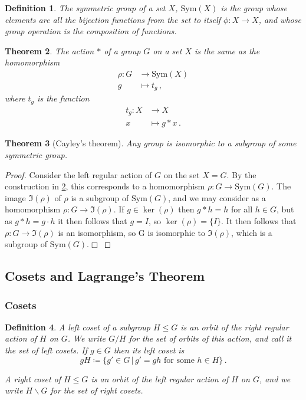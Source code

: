 \documentclass{article}
\theoremstyle{plain}\theoremheaderfont{\normalfont\itshape}\theorembodyfont{\rmfamily}\theoremseparator{.}\newtheorem*{rem}{Remark}\newtheorem*{ex}{Example}\newtheorem*{proof}{Proof}\newtheorem*{altp}{Alternative proof}
\theoremstyle{plain}\theoremheaderfont{\normalfont\bfseries}\theorembodyfont{\rmfamily}\theoremseparator{.}\newtheorem{thm}{Theorem}[section]\newtheorem{lem}[thm]{Lemma}\newtheorem{prop}[thm]{Proposition}\newtheorem*{cor}{Corollary}\newtheorem{defn}[thm]{Definition}\newtheorem{clm}[thm]{Claim}\newtheorem{clminproof}{Claim}
\theoremstyle{break}\theoremheaderfont{\normalfont\itshape}\theorembodyfont{\rmfamily}\theoremseparator{.\medskip}\newtheorem*{proofskip}{Proof}\newtheorem*{exs}{Examples}\newtheorem*{rems}{Remarks}
\theoremstyle{break}\theoremheaderfont{\normalfont\bfseries}\theorembodyfont{\rmfamily}\theoremseparator{.\medskip}\newtheorem{lemskip}[thm]{Lemma}\newtheorem{defnskip}[thm]{Definition}\newtheorem{propskip}[thm]{Proposition}\newtheorem{thmskip}[thm]{Theorem}
\numberwithin{equation}{section}
\newcommand{\qed}{\hfill\ensuremath{\Box}}
\begin{document}
	\begin{defn}
		The \textit{symmetric group} of a set \(X\), \(\mathrm{Sym}(X)\) is the group whose elements are all the bijection functions from the set to itself \(\phi: X\to X\), and whose group operation is the composition of functions.
	\end{defn}
	\begin{thm}\label{actionthm}
		The action \(*\) of a group \(G\) on a set \(X\) is the same as the homomorphism
		\begin{align*}
			\rho:G&\to\mathrm{Sym}(X)\\
			g&\mapsto t_g\,,
		\end{align*}
		where \(t_g\) is the function
		\begin{align*}
			t_g:X&\to X\\
			x&\mapsto g*x\,.
		\end{align*}
	\end{thm}
	\begin{thm}[Cayley's theorem]\label{caythm}
		Any group is isomorphic to a subgroup of some symmetric group.
	\end{thm}
	\begin{proof}
		Consider the left regular action of \(G\) on the set \(X=G\). By the construction in \cref{actionthm}, this corresponds to a homomorphism \(\rho:G\to\mathrm{Sym}(G)\). The image \(\Im(\rho)\) of \(\rho\) is a subgroup of \(\mathrm{Sym}(G)\), and we may consider as a homomorphism \(\rho:G\to\Im(\rho)\). If \(g\in\ker(\rho)\) then \(g*h=h\) for all \(h\in G\), but as \(g*h=g\cdot h\) it then follows that \(g = I\), so \(\ker(\rho)=\{I\}\). It then follows that \(\rho:G\to\Im(\rho)\) is an isomorphism, so G is isomorphic to \(\Im(\rho)\), which is a subgroup of \(\mathrm{Sym}(G)\).\qed
	\end{proof}
	
	\subsection{Cosets and Lagrange's Theorem}
	\subsubsection{Cosets}
	\begin{defn}
		A \textit{left coset} of a subgroup \(H\le G\) is an orbit of the right regular action of \(H\) on \(G\). We write \(G/ H\) for the set of orbits of this action, and call it \textit{the set of left cosets}. If \(g\in G\) then its left coset is
		\[gH\coloneqq\{g'\in G\,|\,g'=gh\text{ for some }h\in H\}\,.\]

		A \textit{right coset} of \(H\le G\) is an orbit of the left regular action of \(H\) on \(G\), and we write \(H\backslash G\) for \textit{the set of right cosets}.
	\end{defn}
	
\end{document}
